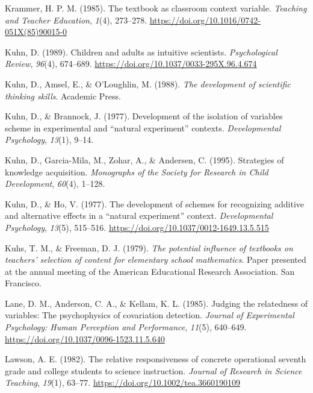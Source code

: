 \documentclass[11pt]{umnthesis}
\newlength{\cslhangindent}
\newenvironment{CSLReferences}[2] %
 {%
  \setlength{\parindent}{0pt}
  \ifodd #1 \everypar{\setlength{\hangindent}{\cslhangindent}}\ignorespaces\fi
  \ifnum #2 > 0
  \setlength{\parskip}{#2\baselineskip}
  \fi
 }%
 {}
\begin{document}
\begin{CSLReferences}{1}{0}
\leavevmode{}%
Krammer, H. P. M. (1985). The textbook as classroom context variable. \emph{Teaching and Teacher Education}, \emph{1}(4), 273--278. \url{https://doi.org/10.1016/0742-051X(85)90015-0}

\leavevmode{}%
Kuhn, D. (1989). Children and adults as intuitive scientists. \emph{Psychological Review}, \emph{96}(4), 674--689. \url{https://doi.org/10.1037/0033-295X.96.4.674}

\leavevmode{}%
Kuhn, D., Amsel, E., \& O'Loughlin, M. (1988). \emph{The development of scientific thinking skills}. Academic Press.

\leavevmode{}%
Kuhn, D., \& Brannock, J. (1977). Development of the isolation of variables scheme in experimental and {``natural experiment''} contexts. \emph{Developmental Psychology}, \emph{13}(1), 9--14.

\leavevmode{}%
Kuhn, D., Garcia-Mila, M., Zohar, A., \& Andersen, C. (1995). Strategies of knowledge acquisition. \emph{Monographs of the Society for Research in Child Development}, \emph{60}(4), 1--128.

\leavevmode{}%
Kuhn, D., \& Ho, V. (1977). The development of schemes for recognizing additive and alternative effects in a {``natural experiment''} context. \emph{Developmental Psychology}, \emph{13}(5), 515--516. \url{https://doi.org/10.1037/0012-1649.13.5.515}

\leavevmode{}%
Kuhs, T. M., \& Freeman, D. J. (1979). \emph{The potential influence of textbooks on teachers' selection of content for elementary school mathematics}. {Paper presented at the annual meeting of the American Educational Research Association. San Francisco}.

\leavevmode{}%
Lane, D. M., Anderson, C. A., \& Kellam, K. L. (1985). Judging the relatedness of variables: The psychophysics of covariation detection. \emph{Journal of Experimental Psychology: Human Perception and Performance}, \emph{11}(5), 640--649. \url{https://doi.org/10.1037/0096-1523.11.5.640}

\leavevmode{}%
Lawson, A. E. (1982). The relative responsiveness of concrete operational seventh grade and college students to science instruction. \emph{Journal of Research in Science Teaching}, \emph{19}(1), 63--77. \url{https://doi.org/10.1002/tea.3660190109}


\end{CSLReferences}
\end{document}
